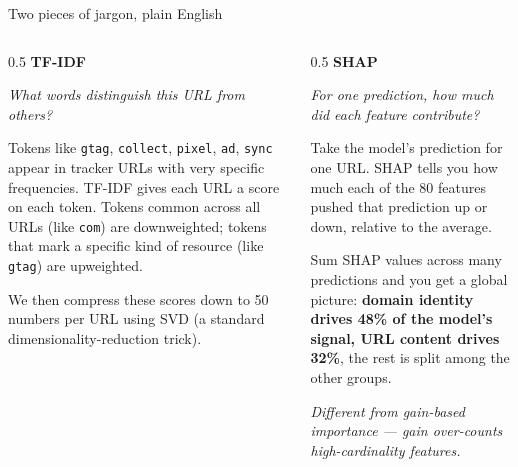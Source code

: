 \documentclass[10pt,aspectratio=169]{beamer}
\begin{document}
\begin{frame}{Two pieces of jargon, plain English}
    \begin{columns}[T]
    \begin{column}{0.5\textwidth}
        \textbf{\Large TF-IDF}

        \vspace{0.4em}
        \small
        \textit{What words distinguish this URL from others?}

        \vspace{0.5em}
        Tokens like \texttt{gtag}, \texttt{collect}, \texttt{pixel}, \texttt{ad}, \texttt{sync} appear in tracker URLs with very specific frequencies. TF-IDF gives each URL a score on each token. Tokens common across all URLs (like \texttt{com}) are downweighted; tokens that mark a specific kind of resource (like \texttt{gtag}) are upweighted.

        \vspace{0.4em}
        We then compress these scores down to 50 numbers per URL using SVD (a standard dimensionality-reduction trick).
    \end{column}
    \begin{column}{0.5\textwidth}
        \textbf{\Large SHAP}

        \vspace{0.4em}
        \small
        \textit{For one prediction, how much did each feature contribute?}

        \vspace{0.5em}
        Take the model's prediction for one URL. SHAP tells you how much each of the 80 features pushed that prediction up or down, relative to the average.

        \vspace{0.4em}
        Sum SHAP values across many predictions and you get a global picture: \textbf{domain identity drives 48\% of the model's signal, URL content drives 32\%}, the rest is split among the other groups.

        \vspace{0.4em}
        \textit{Different from gain-based importance — gain over-counts high-cardinality features.}
    \end{column}
    \end{columns}
\end{frame}
\end{document}
